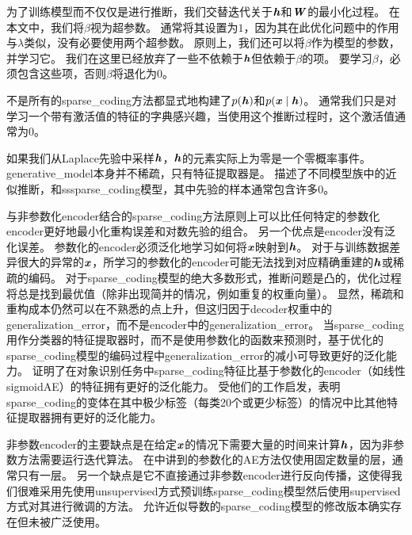 为了训练模型而不仅仅是进行推断，我们交替迭代关于$\boldsymbol{\mathit{h}}$和$\boldsymbol{\mathit{W}}$的最小化过程。
在本文中，我们将$\beta$视为超参数。
通常将其设置为$1$，因为其在此优化问题中的作用与$\lambda$类似，没有必要使用两个超参数。 
原则上，我们还可以将$\beta$作为模型的参数，并学习它。
我们在这里已经放弃了一些不依赖于$\boldsymbol{\mathit{h}}$但依赖于$\beta$的项。
要学习$\beta$，必须包含这些项，否则$\beta$将退化为$0$。


不是所有的\gls{sparse_coding}方法都显式地构建了$p(\boldsymbol{\mathit{h}})$和$p(\boldsymbol{\mathit{x}}\mid\boldsymbol{\mathit{h}})$。 
通常我们只是对学习一个带有激活值的特征的字典感兴趣，当使用这个推断过程时，这个激活值通常为$0$。

如果我们从Laplace先验中采样$\boldsymbol{\mathit{h}}$，$\boldsymbol{\mathit{h}}$的元素实际上为零是一个零概率事件。
\gls{generative_model}本身并不稀疏，只有特征提取器是。
\citet{Goodfeli-et-al-TPAMI-Deep-PrePrint-2013-small}描述了不同模型族中的近似推断，和\gls{ss}\gls{sparse_coding}模型，其中先验的样本通常包含许多0。

与非参数化\gls{encoder}结合的\gls{sparse_coding}方法原则上可以比任何特定的参数化\gls{encoder}更好地最小化重构误差和对数先验的组合。
另一个优点是\gls{encoder}没有泛化误差。
参数化的\gls{encoder}必须泛化地学习如何将$\boldsymbol{\mathit{x}}$映射到$\boldsymbol{\mathit{h}}$。
对于与训练数据差异很大的异常的$\boldsymbol{\mathit{x}}$，所学习的参数化的\gls{encoder}可能无法找到对应精确重建的$\boldsymbol{\mathit{h}}$或稀疏的编码。
对于\gls{sparse_coding}模型的绝大多数形式，推断问题是凸的，优化过程将总是找到最优值（除非出现简并的情况，例如重复的权重向量）。
显然，稀疏和重构成本仍然可以在不熟悉的点上升，但这归因于\gls{decoder}权重中的\gls{generalization_error}，而不是\gls{encoder}中的\gls{generalization_error}。
当\gls{sparse_coding}用作分类器的特征提取器时，而不是使用参数化的函数来预测时，基于优化的\gls{sparse_coding}模型的编码过程中\gls{generalization_error}的减小可导致更好的泛化能力。
\citet{Coates2011b}证明了在对象识别任务中\gls{sparse_coding}特征比基于参数化的\gls{encoder}（如线性\gls{sigmoid}\gls{AE}）的特征拥有更好的泛化能力。
受他们的工作启发，\citet{Goodfeli-et-al-TPAMI-Deep-PrePrint-2013-small}表明\gls{sparse_coding}的变体在其中极少标签（每类20个或更少标签）的情况中比其他特征提取器拥有更好的泛化能力。



非参数\gls{encoder}的主要缺点是在给定$\boldsymbol{\mathit{x}}$的情况下需要大量的时间来计算$\boldsymbol{\mathit{h}}$，因为非参数方法需要运行迭代算法。
在中讲到的参数化的\gls{AE}方法仅使用固定数量的层，通常只有一层。
另一个缺点是它不直接通过非参数\gls{encoder}进行反向传播，这使得我们很难采用先使用\gls{unsupervised}方式预训练\gls{sparse_coding}模型然后使用\gls{supervised}方式对其进行微调的方法。
允许近似导数的\gls{sparse_coding}模型的修改版本确实存在但未被广泛使用\citep{Bradley+Bagnell-2009-small}。

